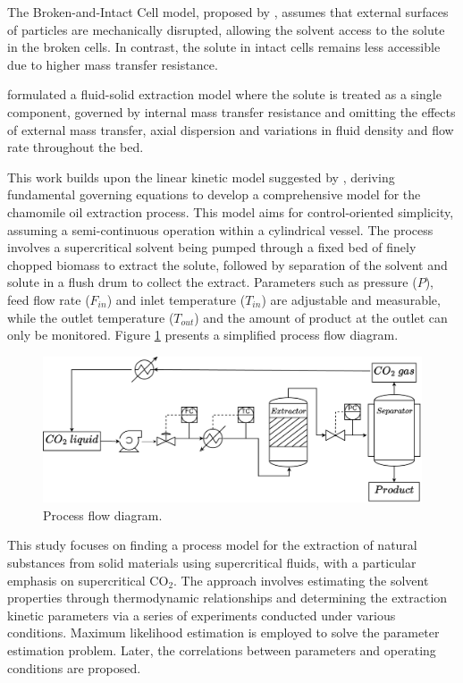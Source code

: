 \documentclass[../Article_Model_Parameters.tex]{subfiles}
\begin{document}
	The Broken-and-Intact Cell model, proposed by \citet{Sovova1994}, assumes that external surfaces of particles are mechanically disrupted, allowing the solvent access to the solute in the broken cells. In contrast, the solute in intact cells remains less accessible due to higher mass transfer resistance.
	
	\citet{Reverchon1996} formulated a fluid-solid extraction model where the solute is treated as a single component, governed by internal mass transfer resistance and omitting the effects of external mass transfer, axial dispersion and variations in fluid density and flow rate throughout the bed.
	
	This work builds upon the linear kinetic model suggested by \citet{Reverchon1996}, deriving fundamental governing equations to develop a comprehensive model for the chamomile oil extraction process. This model aims for control-oriented simplicity, assuming a semi-continuous operation within a cylindrical vessel. The process involves a supercritical solvent being pumped through a fixed bed of finely chopped biomass to extract the solute, followed by separation of the solvent and solute in a flush drum to collect the extract. Parameters such as pressure ($P$), feed flow rate ($F_{in}$) and inlet temperature ($T_{in}$) are adjustable and measurable, while the outlet temperature ($T_{out}$) and the amount of product at the outlet can only be monitored. Figure \ref{fig: SFE_drawing} presents a simplified process flow diagram.
	
	\begin{figure}[h!]
		\centering
		\includegraphics[width=\columnwidth]{Figures/PFD.drawio.pdf}
		\caption{Process flow diagram.}
		\label{fig: SFE_drawing}
	\end{figure}
		
	This study focuses on finding a process model for the extraction of natural substances from solid materials using supercritical fluids, with a particular emphasis on supercritical CO$_2$. The approach involves estimating the solvent properties through thermodynamic relationships and determining the extraction kinetic parameters via a series of experiments conducted under various conditions. Maximum likelihood estimation is employed to solve the parameter estimation problem. Later, the correlations between parameters and operating conditions are proposed.
		
\end{document}
